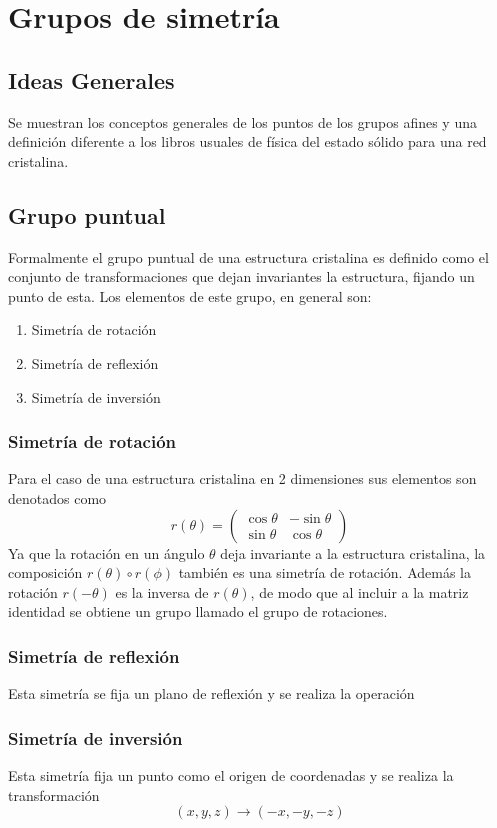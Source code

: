 \chapter{Grupos de simetría}\label{aped.A}

\section{Ideas Generales}
\label{A.1.}

Se muestran los conceptos generales de los puntos de los grupos afines y una definición diferente a los libros usuales de física del estado sólido para una red cristalina.
\section{Grupo puntual}
Formalmente el grupo puntual de una estructura cristalina es definido como el conjunto de transformaciones que dejan invariantes la estructura, fijando un punto de esta. Los elementos de este grupo, en general son:
\begin{enumerate}
	\item Simetría de rotación
	\item Simetría de reflexión
	\item Simetría de inversión
\end{enumerate}
\subsection{Simetría de rotación}
Para el caso de una estructura cristalina en 2 dimensiones sus elementos son denotados como
\begin{equation}
	r(\theta) = \begin{pmatrix}
		\cos\theta & -\sin\theta \\
		\sin\theta & \cos\theta
	\end{pmatrix}
\end{equation}
Ya que la rotación en un ángulo $\theta$ deja invariante a la estructura cristalina, la composición $r(\theta)\circ r(\phi)$ también es una simetría de rotación. Además la rotación $r(-\theta)$ es la inversa de $r(\theta)$, de modo que al incluir a la matriz identidad se obtiene un grupo llamado el grupo de rotaciones.
\subsection{Simetría de reflexión}
Esta simetría se fija un plano de reflexión y se realiza la operación
\subsection{Simetría de inversión}
Esta simetría fija un punto como el origen de coordenadas y se realiza la transformación
\begin{equation}
	(x,y,z) \longrightarrow (-x, -y ,-z)
\end{equation}

